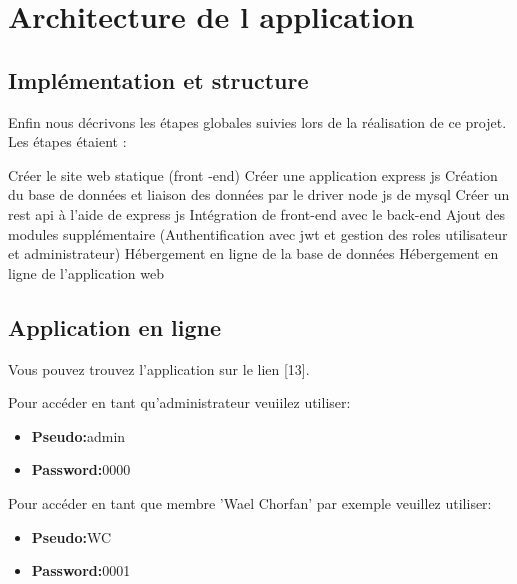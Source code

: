 \section{Architecture de l application}
\subsection{Impl\'{e}mentation et structure}
Enfin nous d\'{e}crivons les \'{e}tapes globales suivies lors de la r\'{e}alisation de ce projet.
Les \'{e}tapes \'{e}taient :
\bigskip


\textbullet{}  Cr\'{e}er le site web statique (front -end)  \newline
\textbullet{} Cr\'{e}er une application express js  \newline
\textbullet{}  Cr\'{e}ation du base de donn\'{e}es et liaison des donn\'{e}es par le driver node js  de mysql \newline
\textbullet{}Cr\'{e}er un rest api \`{a} l'aide de express js  \newline
\textbullet{}Int\'{e}gration de front-end avec le back-end  \newline
\textbullet{}Ajout des modules suppl\'{e}mentaire (Authentification avec jwt et gestion des roles utilisateur et administrateur)  \newline
\textbullet{}  H\'{e}bergement en ligne de la base de donn\'{e}es \newline
\textbullet{} H\'{e}bergement en ligne de l'application web  \newline




\subsection{Application en ligne}
Vous pouvez trouvez l'application sur le lien [13].


  Pour acc\'{e}der en tant qu'administrateur veuiilez utiliser:

  \begin{itemize}
    \item {\textbf{ Pseudo:}admin}
    \item {\textbf{ Password:}0000}
  \end{itemize}


  Pour acc\'{e}der en tant que membre 'Wael Chorfan' par exemple veuillez utiliser:

  \begin{itemize}
    \item {\textbf{ Pseudo:}WC}
    \item {\textbf{ Password:}0001}
  \end{itemize}




